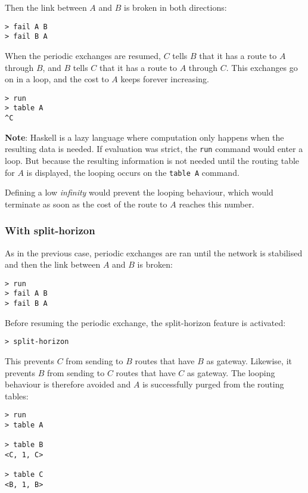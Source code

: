 \documentclass{scrartcl}
\begin{document}
Then the link between $A$ and $B$ is broken in both directions:

\begin{verbatim}
> fail A B
> fail B A
\end{verbatim}

When the periodic exchanges are resumed, $C$ tells $B$ that it has a route to
$A$ through $B$, and $B$ tells $C$ that it has a route to $A$ through $C$. This
exchanges go on in a loop, and the cost to $A$ keeps forever increasing.

\begin{verbatim}
> run
> table A
^C
\end{verbatim}

\textbf{Note}: Haskell is a lazy language where computation only happens when
the resulting data is needed. If evaluation was strict, the \texttt{run} command
would enter a loop. But because the resulting information is not needed until
the routing table for $A$ is displayed, the looping occurs on the \texttt{table
A} command.

Defining a low \textit{infinity} would prevent the looping behaviour, which
would terminate as soon as the cost of the route to $A$ reaches this number.

\subsubsection{With split-horizon}

As in the previous case, periodic exchanges are ran until the network is
stabilised and then the link between $A$ and $B$ is broken:

\begin{verbatim}
> run
> fail A B
> fail B A
\end{verbatim}

Before resuming the periodic exchange, the split-horizon feature is activated:

\begin{verbatim}
> split-horizon
\end{verbatim}

This prevents $C$ from sending to $B$ routes that have $B$ as gateway.
Likewise, it prevents $B$ from sending to $C$ routes that have $C$ as gateway.
The looping behaviour is therefore avoided and $A$ is successfully purged from
the routing tables:

\begin{verbatim}
> run
> table A

> table B
<C, 1, C>

> table C
<B, 1, B>
\end{verbatim}
\end{document}
